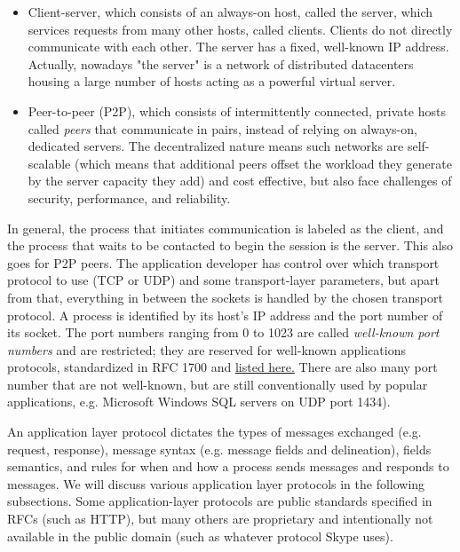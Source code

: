 \documentclass[table, xcdraw]{article}%
\begin{document}
\begin{itemize}
    \item Client-server, which consists of an always-on host, called the server, which services requests from many other hosts, called clients. Clients do not directly communicate with each other. The server has a fixed, well-known IP address. Actually, nowadays "the server" is a network of distributed datacenters housing a large number of hosts acting as a powerful virtual server.
    \item Peer-to-peer (P2P), which consists of intermittently connected, private hosts called \emph{peers} that communicate in pairs, instead of relying on always-on, dedicated servers. The decentralized nature means such networks are self-scalable (which means that additional peers offset the workload they generate by the server capacity they add) and cost effective, but also face challenges of security, performance, and reliability.
\end{itemize}

In general, the process that initiates communication is labeled as the client, and the process that waits to be contacted to begin the session is the server. This also goes for P2P peers. The application developer has control over which transport protocol to use (TCP or UDP) and some transport-layer parameters, but apart from that, everything in between the sockets is handled by the chosen transport protocol. A process is identified by its host's IP address and the port number of its socket. The port numbers ranging from 0 to 1023 are called \emph{well-known port numbers}
and are restricted; they are reserved for well-known applications protocols, standardized in RFC 1700 and \href{https://en.wikipedia.org/wiki/List_of_TCP_and_UDP_port_numbers}{listed here.} There are also many port number that are not well-known, but are still conventionally used by popular applications, e.g. Microsoft Windows SQL servers on UDP port 1434).

An application layer protocol dictates the types of messages exchanged (e.g. request, response), message syntax (e.g. message fields and delineation), fields semantics, and rules for when and how a process sends messages and responds to messages. We will discuss various application layer protocols in the following subsections. Some application-layer protocols are public standards specified in RFCs (such as HTTP), but many others are proprietary and intentionally not available in the public domain (such as whatever protocol Skype uses).
\end{document}
